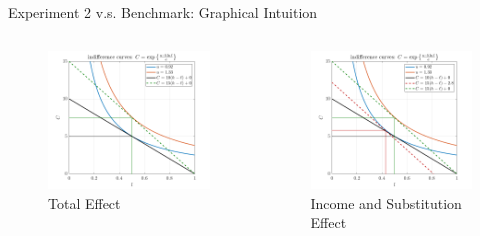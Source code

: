 \documentclass[11pt,aspectratio=169,usenames,dvipsnames]{beamer}
\begin{document}
\begin{frame}{Experiment 2 v.s. Benchmark: Graphical Intuition}
\label{slide:Solve_for_Experiment_2__Graphical_Intuition}
    \begin{columns}
        \begin{column}{0.5\textwidth}
             \begin{figure}
                \caption{Total Effect}
                 \includegraphics[width=\textwidth]{./figures/Experiment2IC.png}
             \end{figure}
        \end{column}
        \begin{column}{0.5\textwidth}
             \begin{figure}
                \caption{Income and Substitution Effect}
                 \includegraphics[width=\textwidth]{./figures/Experiment2IncomeSubEffect.png}
             \end{figure}
        \end{column}
    \end{columns}
\end{frame}
\end{document}
